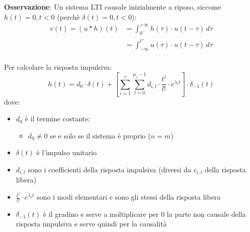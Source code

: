 \documentclass[a4paper]{article}
\begin{document}
\noindent
\textbf{Osservazione}: Un sistema LTI causale inizialmente a riposo, siccome \( h(t) = 0
, t < 0\) (perchè \( \delta(t) = 0, t < 0 \)):
\[
  \begin{aligned}
    v(t) = (u \ast h)(t) &= \int_{0^-}^{+\infty} h(\tau) \cdot u(t-\tau) \, d\tau\\
                         &= \int_{-\infty}^{t^+} u(\tau) \cdot u(t-\tau) \, d\tau\\
  \end{aligned}
\] 

\vspace{1em}
\noindent
Per calcolare la risposta impulsiva: 
\[
  h(t) = d_0 \cdot \delta(t) + \left[\sum_{i=1}^{r} \sum_{l=0}^{\mu_i-1} d_{i,l} \cdot \frac{t^l}{l!}
  \cdot e^{\lambda_i t}\right] \cdot \delta_{-1}(t)
\] 
dove:
\begin{itemize}
  \item \( d_0 \) è il termine costante:
    \begin{itemize}
      \item \( d_0 \neq 0 \) se e solo se il sistema è proprio (\( n=m \))
    \end{itemize}

  \item \( \delta(t) \) è l'impulso unitario

  \item \( d_{i,l} \) sono i coefficienti della risposta impulsiva 
    (diversi da \( c_{i,l} \) della risposta libera)

  \item \( \frac{t^l}{l!} \cdot e^{\lambda_i t} \) sono i modi elementari e sono
    gli stessi della risposta libera

  \item \( \delta_{-1}(t) \) è il gradino e serve a moltiplicare per 0 la parte
    non causale della risposta impulsiva e serve quindi per la causalità
\end{itemize}
\end{document}
